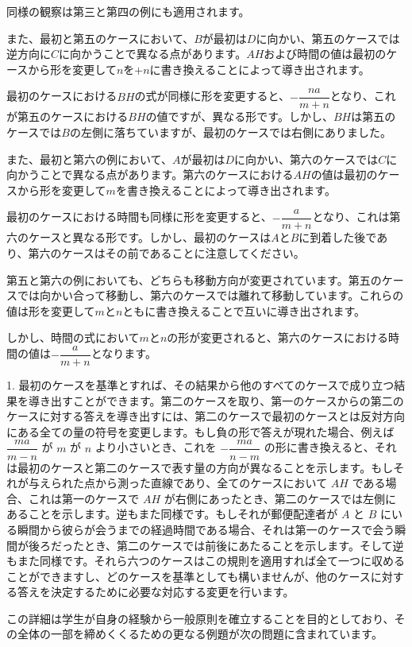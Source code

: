 \documentclass[a4paper,11pt,openany]{ltjsbook}
\begin{document}
同様の観察は第三と第四の例にも適用されます。

また、最初と第五のケースにおいて、$B$が最初は$D$に向かい、第五のケースでは逆方向に$C$に向かうことで異なる点があります。$AH$および時間の値は最初のケースから形を変更して$n$を$+n$に書き換えることによって導き出されます。

最初のケースにおける$BH$の式が同様に形を変更すると、$-\dfrac{na}{m + n}$となり、これが第五のケースにおける$BH$の値ですが、異なる形です。しかし、$BH$は第五のケースでは$B$の左側に落ちていますが、最初のケースでは右側にありました。

また、最初と第六の例において、$A$が最初は$D$に向かい、第六のケースでは$C$に向かうことで異なる点があります。第六のケースにおける$AH$の値は最初のケースから形を変更して$m$を書き換えることによって導き出されます。

最初のケースにおける時間も同様に形を変更すると、$-\dfrac{a}{m + n}$となり、これは第六のケースと異なる形です。しかし、最初のケースは$A$と$B$に到着した後であり、第六のケースはその前であることに注意してください。

第五と第六の例においても、どちらも移動方向が変更されています。第五のケースでは向かい合って移動し、第六のケースでは離れて移動しています。これらの値は形を変更して$m$と$n$ともに書き換えることで互いに導き出されます。

しかし、時間の式において$m$と$n$の形が変更されると、第六のケースにおける時間の値は$-\dfrac{a}{m + n}$となります。

1. 最初のケースを基準とすれば、その結果から他のすべてのケースで成り立つ結果を導き出すことができます。第二のケースを取り、第一のケースからの第二のケースに対する答えを導き出すには、第二のケースで最初のケースとは反対方向にある全ての量の符号を変更します。もし負の形で答えが現れた場合、例えば $\dfrac{ma}{m - n}$ が $m$ が $n$ より小さいとき、これを $-\dfrac{ma}{n - m}$ の形に書き換えると、それは最初のケースと第二のケースで表す量の方向が異なることを示します。もしそれが与えられた点から測った直線であり、全てのケースにおいて $AH$ である場合、これは第一のケースで $AH$ が右側にあったとき、第二のケースでは左側にあることを示します。逆もまた同様です。もしそれが郵便配達者が $A$ と $B$ にいる瞬間から彼らが会うまでの経過時間である場合、それは第一のケースで会う瞬間が後ろだったとき、第二のケースでは前後にあたることを示します。そして逆もまた同様です。それら六つのケースはこの規則を適用すれば全て一つに収めることができますし、どのケースを基準としても構いませんが、他のケースに対する答えを決定するために必要な対応する変更を行います。

この詳細は学生が自身の経験から一般原則を確立することを目的としており、その全体の一部を締めくくるための更なる例題が次の問題に含まれています。
\end{document}
